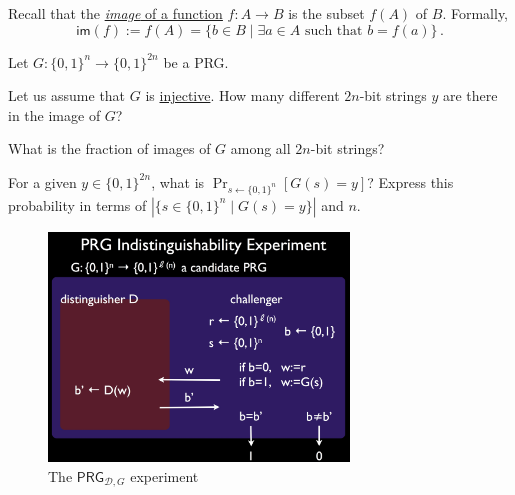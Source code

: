 \documentclass[a4paper,10pt,landscape,twocolumn]{scrartcl}
\begin{document}
\begin{exercise}
Recall that the \href{https://en.wikipedia.org/wiki/Image_(mathematics)}{\emph{image} of a function} $f:A \rightarrow B$ is the subset $f(A)$ of $B$. Formally,
\[ \mathsf{im}(f) := f(A) = \{b \in B \mid \exists a \in A \mbox{ such that } b=f(a) \} \, .
\]

Let $G:\{0,1\}^n \rightarrow \{0,1\}^{2n}$ be a PRG.

\begin{subex}
Let us assume that $G$ is \href{https://en.wikipedia.org/wiki/Injective_function}{injective}. How many different $2n$-bit strings $y$ are there in the image of $G$?
\end{subex}

\begin{subex}
What is the fraction of images of $G$ among all $2n$-bit strings?
\end{subex}

\begin{subex}
For a given $y \in \{0,1\}^{2n}$, what is $\Pr_{s \leftarrow
  \{0,1\}^n}[G(s) = y]$? Express this probability in terms of $|\{s \in \{0,1\}^n \mid G(s)=y\} |$ and $n$.
\end{subex}

\end{exercise}

\begin{figure}[h]
\center
\includegraphics[width=8cm]{PRGExperiment.jpg}
\caption{The $\mathsf{PRG}_{\mathcal{D},G}$ experiment \label{fig:prg-exp}}
\end{figure}
\end{document}
